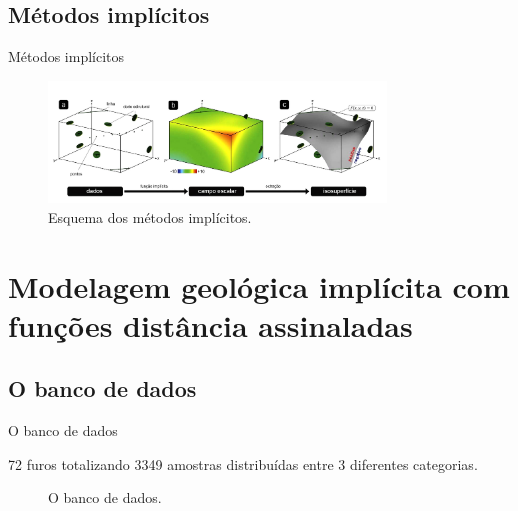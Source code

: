 \documentclass[aspectratio=169]{beamer}
\begin{document}
\subsection{Métodos implícitos}

\begin{frame}{Métodos implícitos}
	\begin{figure}[H]
		\begin{center}
			\includegraphics[width=0.8\textwidth]{capitulo_1/implicit_modelig_pt_1}
			\caption{Esquema dos métodos implícitos.}
		\end{center}
	\end{figure}
\end{frame}

\section{Modelagem geológica implícita com funções distância assinaladas}

\subsection{O banco de dados}

\begin{frame}{O banco de dados}

72 furos totalizando 3349 amostras distribuídas entre 3 diferentes categorias.

	\begin{figure}
		\centering
		\hspace{20mm}
		\caption{O banco de dados.}
	\end{figure}
		
\end{frame}
\end{document}
